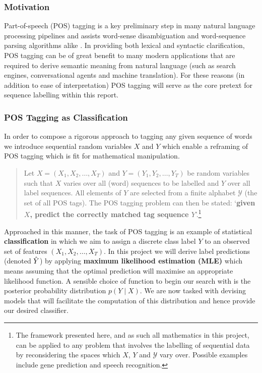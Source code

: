 \documentclass[../main.tex]{subfiles}
\begin{document}
\subsubsection{Motivation}
Part-of-speech (POS) tagging is a key preliminary step in many natural language processing pipelines and assists word-sense disambiguation and word-sequence parsing algorithms alike \autocite{allen-nlu-1995}.
In providing both lexical and syntactic clarification, POS tagging can be of great benefit to many modern applications that are required to derive semantic meaning from natural language (such as search engines, conversational agents and machine translation).
For these reasons (in addition to ease of interpretation) POS tagging will serve as the core pretext for sequence labelling within this report.

\subsubsection{POS Tagging as Classification} \label{sec:pos-classification}

In order to compose a rigorous approach to tagging any given sequence of words we introduce sequential random variables $X$ and $Y$ which enable a reframing of POS tagging which is fit for mathematical manipulation.
\begin{quote}
Let $X = (X_1,X_2,\ldots,X_T)$ and $Y = (Y_1,Y_2,\ldots,Y_T)$ be random variables such that $X$ varies over all (word) sequences to be labelled and $Y$ over all label sequences.
All elements of $Y$ are selected from a finite alphabet $\mathcal{Y}$ (the set of all POS tags).
The POS tagging problem can then be stated:
`\textbf{given $X$, predict the correctly matched tag sequence $Y$}'.\footnote{The framework presented here, and as such all mathematics in this project, can be applied 
to any problem that involves the labelling of sequential data by reconsidering the spaces which $X$, $Y$ and $\mathcal{Y}$ vary over. Possible examples include gene prediction and speech recognition.}
\end{quote}
Approached in this manner, the task of POS tagging is an example of statistical \textbf{classification} in which we aim to assign a discrete class label $Y$ to an observed set of features $(X_1,X_2,\ldots,X_T)$.
In this project we will derive label predictions (denoted $\hat{Y}$) by applying \textbf{maximum likelihood estimation (MLE)} which means assuming that the optimal prediction will maximise an appropriate likelihood function.
A sensible choice of function to begin our search with is the posterior probability distribution $p(Y \mid X)$.
We are now tasked with devising models that will facilitate the computation of this distribution and hence provide our desired classifier.
\end{document}
